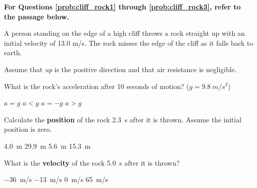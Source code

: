 \documentclass{exam}
\begin{document}
\begin{questions}






\clearpage
\begin{EnvUplevel}
\textbf{For Questions \ref{prob:cliff_rock1} through \ref{prob:cliff_rock3}, refer to the passage below.}

A person standing on the edge of a high cliff throws a rock straight up with an initial velocity of 13.0 m/s. The rock misses the edge of the cliff as it falls back to earth.

Assume that \textit{up} is the positive direction and that air resistance is negligible.
\end{EnvUplevel}%

\question \label{prob:cliff_rock1}
What is the rock's acceleration after 10 seconds of motion? ($g = \SI{9.8}{m/s^2}$)

\begin{choices}
\choice $a = g$
\choice $a < g$
\correctchoice $a = -g$
\choice $a > g$
\end{choices}

\question \label{prob:cliff_rock2}
Calculate the \textbf{position} of the rock \SI{2.3}{s} after it is thrown. Assume the initial position is zero.

\begin{choices}
\correctchoice \SI{4.0}{m}
\choice \SI{29.9}{m}
\choice \SI{5.6}{m}
\choice \SI{15.3}{m}
\end{choices}

\question \label{prob:cliff_rock3}
What is the \textbf{velocity} of the rock \SI{5.0}{s} after it is thrown?

\begin{choices}
\correctchoice \SI{-36}{m/s}
\choice \SI{-13}{m/s}
\choice \SI{0}{m/s}
\choice \SI{65}{m/s}
\end{choices}


\end{questions}
\end{document}
